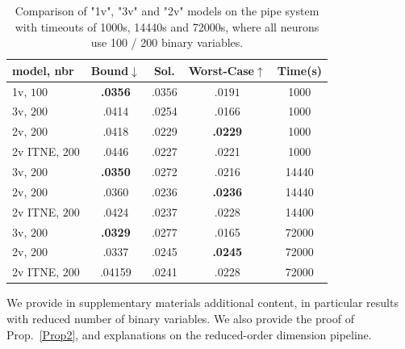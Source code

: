 		
	\begin{table}[h!]
	\begin{tabular}{||l||c|c|c|c||}\hline\hline
		model, nbr&        Bound$\downarrow$ &  Sol. &      Worst-Case$\uparrow$ &  Time(s) \\\hline \hline
		1v, $100$ &     {\bf .0356} &  $.0356$ & $.0191$ &  1000 \\\hline
		3v, $200$&     .0414 &  .0254 &  .0166 &  1000 \\\hline
		2v, $200$&     .0418 &  .0229 &   {\bf .0229} &  1000 \\\hline 
		2v ITNE, $200$&  .0446  & .0227 &  .0221  &  1000 \\\hline\hline
		3v, $200$&      {\bf .0350} &  .0272 &  .0216 & 14440 \\\hline
		2v, $200$&     .0360 &  .0236 &    {\bf .0236} & 14440 \\\hline 
		2v ITNE, $200$& .0424  &  .0237  & .0228   &  14400 \\\hline\hline
		3v, $200$&     {\bf .0329} &  .0277 &  .0165 & 72000 \\\hline
		2v, $200$&     .0337 &  .0245 &  {\bf .0245} & 72000 \\\hline
		2v ITNE, $200$&  .04159 & .0241 &  .0228  &  72000 \\\hline\hline
	\end{tabular}
	\caption{Comparison of "1v", "3v" and "2v" models on the pipe system with timeouts of 1000s, 14440s and 72000s, where all neurons use 100 / 200 binary variables.}
	\label{table.pipe}
\end{table}

\newpage

 We provide in supplementary materials additional content, in particular results with reduced number of binary variables. We also provide the proof of Prop.~\ref{Prop2}, and explanations on the reduced-order dimension pipeline.

\fi
